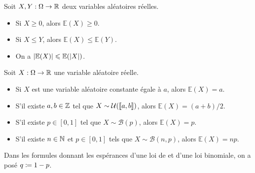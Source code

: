 \documentclass{magnolia}
\begin{document}
\begin{proposition}
Soit $X,Y:\Omega\to\mathbb{R}$ deux variables aléatoires réelles.
\begin{itemize}
\item Si $X\geq 0$, alors $\mathbb{E}(X)\geq 0$.
\item Si $X\leq Y$, alors $\mathbb{E}(X)\leq\mathbb{E}(Y)$.
\item On a $\left|\mathbb{E}(X)\right|\leqslant \mathbb{E}(\left|X\right|)$.
\end{itemize}
\end{proposition}

\begin{proposition}
Soit $X:\Omega\to\mathbb{R}$ une variable aléatoire réelle.
\begin{itemize}
\item Si $X$ est une variable aléatoire constante égale à $a$, alors $\mathbb{E}(X)=a$.
\item S'il existe $a,b\in\mathbb{Z}$ tel que $X\sim\mathcal{U}(\left\llbracket a,b\right\rrbracket)$, alors
  $\mathbb{E}(X)=(a+b)/2$.
\item S'il existe $p\in[0,1]$ tel que $X\sim\mathcal{B}(p)$, alors $\mathbb{E}(X)=p$.
\item S'il existe $n\in\mathbb{N}$ et $p\in[0,1]$ tels que $X\sim\mathcal{B}(n, p)$, alors
  $\mathbb{E}(X)=np$. 
\end{itemize}
\end{proposition}

\begin{remarqueUnique}
\remarque Dans les formules donnant les espérances d'une loi de  et d'une loi binomiale,
  on a posé $q\coloneqq 1-p$.
\end{remarqueUnique}
\end{document}

